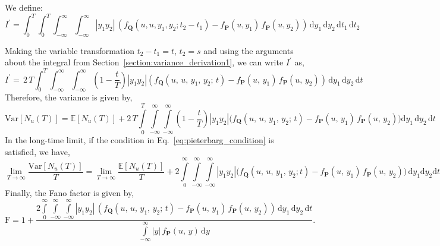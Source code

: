 \documentclass[journal]{IEEEtran}
\theoremstyle{plain}
\theoremstyle{definition}
\theoremstyle{remark}
\newcommand{\E}{\mathbb{E}}
\newcommand{\FF}{\mathrm{F}}
\newcommand{\Nu}{N_u(T)}
\newcommand{\dd}{\mathrm{d}}
\newcommand{\Var}{\text{Var}}
\begin{document}
We define:
\begin{equation}
    I^\prime = \int_0^T \int_0^T \int_{-\infty}^\infty \int_{-\infty}^\infty \left|y_1 y_2\right| \,\left( f_{\mathbf{Q}}(u, u, y_1, y_2;  t_2 - t_1) - f_{\mathbf{P}}(u,y_1) \, f_{\mathbf{P}}(u,y_2)\right)\, \dd y_1 \, \dd y_2 \, \dd t_1 \, \dd t_2
\end{equation}

Making the variable transformation $t_2-t_1=t$, $t_2=s$ and using the arguments about the integral from Section~\ref{section:variance_derivation1}, we can write $I^\prime$ as,
\begin{equation}
    I^\prime = \, 2 \,T \int_{0}^T \int_{-\infty}^\infty \int_{-\infty}^\infty \left(1-\frac{t}{T}\right) \left| y_1 y_2 \right|\left( f_{\mathbf{Q}}(u, \,u, \,y_1, \,y_2; \, t) - f_{\mathbf{P}}(u,\,y_1) \, f_{\mathbf{P}}(u,\,y_2)\right)\, \dd y_1 \, \dd y_2 \, \dd t
\end{equation}
Therefore, the variance is given by,
\begin{equation}
    \Var\left[\Nu\right] = \E\left[\Nu\right] + 2\,T \int\limits_{0}^T \int\limits_{-\infty}^\infty \int\limits_{-\infty}^\infty \left(1-\frac{t}{T}\right)  \left| y_1 y_2 \right| \bigl(f_{\mathbf{Q}}(u, \,u, \,y_1, \,y_2; \, t) - f_{\mathbf{P}}(u,\,y_1) \, f_{\mathbf{P}}(u,\,y_2)\bigr) \dd y_1 \, \dd y_2 \, \dd t
 \label{eq:variance_formula_triple_integral_crossing}
\end{equation}
In the long-time limit, if the condition in Eq.~\eqref{eq:pieterbarg_condition} is satisfied, we have,
\begin{equation}
    \lim_{T \rightarrow \infty}\frac{\Var\left[\Nu\right]}{T} = \lim_{T \rightarrow \infty}\frac{\E\left[\Nu\right]}{T} + 2 \int\limits_{0}^\infty \int\limits_{-\infty}^\infty \int\limits_{-\infty}^\infty \left|y_1 y_2 \right|\bigl( f_{\mathbf{Q}}(u, \,u, \,y_1, \,y_2;  t)  - f_{\mathbf{P}}(u,\,y_1) \, f_{\mathbf{P}}(u,\,y_2)\bigr)\, \dd y_1  \dd y_2  \dd t
 \label{eq:variance_formula_triple_integral_CLT_crossing}
\end{equation}
Finally, the Fano factor is given by,
\begin{equation}
    \FF = 1 + \frac{2\int\limits_{0}^\infty \int\limits_{-\infty}^\infty \int\limits_{-\infty}^\infty \left|y_1 y_2\right| \,\left( f_{\mathbf{Q}}(u, \,u, \,y_1, \,y_2; \, t) - f_{\mathbf{P}}(u,\,y_1) \, f_{\mathbf{P}}(u,\,y_2)\right)\, \dd y_1 \, \dd y_2 \, \dd t}{\int\limits_{-\infty}^\infty |y|\, f_{\mathbf{P}}(u,\,y) \, \dd y}. \label{eq:fano_factor_upcrossing_1_crossing}
\end{equation}
\end{document}
